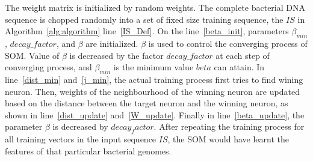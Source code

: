 The weight matrix is initialized by random weights. The complete bacterial DNA sequence is chopped randomly into a set of fixed size training sequence, the $IS$ in Algorithm~\ref{alg:algorithm} line~\ref{IS_Def}. On the line~\ref{beta_init}, parameters $\beta_{min}$, $decay\_factor$, and $\beta$ are initialized. $\beta$ is used to control the converging process of SOM. Value of $\beta$ is decreased by the factor $decay\_factor$ at each step of converging process, and $\beta_{min}$ is the minimum value $beta$ can attain. In line~\ref{dist_min} and~\ref{j_min}, the actual training process first tries to find wining neuron. Then, weights of the neighbourhood of the winning neuron are updated based on the distance between the target neuron and the winning neuron, as shown in line~\ref{dist_update} and~\ref{W_update}. Finally in line~\ref{beta_update}, the parameter $\beta$ is decreased by $decay_factor$. After repeating the training process for all training vectors in the input sequence $IS$, the SOM would have learnt the features of that particular bacterial genomes. 

